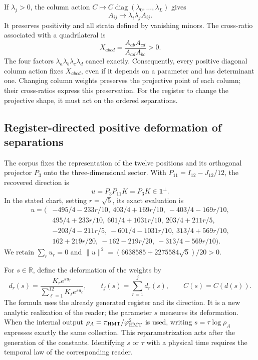 If \(\lambda_j>0\), the column action
\(C\mapsto C\operatorname{diag}(\lambda_0,\ldots,\lambda_L)\) gives
\[
 A_{ij}\longmapsto\lambda_i\lambda_j A_{ij}.
\]
It preserves positivity and all strata defined by vanishing minors.
The cross-ratio associated with a quadrilateral is
\begin{equation}
 X_{abcd}=\frac{A_{ab}A_{cd}}{A_{ad}A_{bc}}>0.
 \label{eq:nc-crossratio}
\end{equation}
The four factors \(\lambda_a\lambda_b\lambda_c\lambda_d\) cancel
exactly. Consequently, every positive diagonal column action fixes
\(X_{abcd}\), even if it depends on a parameter and has determinant
one. Changing column weights preserves the projective point of each
column; their cross-ratios express this preservation. For the register
to change the projective shape, it must act on the ordered separations.

\subsection{Register-directed positive deformation of separations}

The corpus fixes the representation of the twelve positions and its
orthogonal projector \(P_3\) onto the three-dimensional sector.
With \(P_{11}=I_{12}-J_{12}/12\), the recovered direction is
\[
 u=P_3P_{11}K=P_3K\in\mathbf1^\perp.
\]
In the stated chart, setting \(r=\sqrt5\), its exact evaluation is
\begin{align*}
u=(&-495/4-233r/10,\ 403/4+169r/10,\ -403/4-169r/10,\\
   &495/4+233r/10,\ 601/4+1031r/10,\ 203/4+211r/5,\\
   &-203/4-211r/5,\ -601/4-1031r/10,\ 313/4+569r/10,\\
   &162+219r/20,\ -162-219r/20,\ -313/4-569r/10).
\end{align*}
We retain \(\sum_ru_r=0\) and
\(\|u\|^2=(6638585+2275584\sqrt5)/20>0\).

For \(s\in\mathbb R\), define the deformation of the weights by
\begin{equation}
 d_r(s)=\frac{K_re^{su_r}}{\sum_{\ell=1}^{12}K_\ell e^{su_\ell}},
 \qquad t_j(s)=\sum_{r=1}^jd_r(s),\qquad C(s)=C(d(s)).
 \label{eq:nc-gap-flow}
\end{equation}
The formula uses the already generated register and its direction.
It is a new analytic realization of the reader; the parameter \(s\)
measures its deformation. When the internal output
\(\rho_A=\pi_{\rm HMT}/\varphi_{\rm HMT}^2\) is used, writing
\(s=\tau\log\rho_A\) expresses exactly the same collection.
This reparametrization acts after the generation of the constants.
Identifying \(s\) or \(\tau\) with a physical time requires the
temporal law of the corresponding reader.

